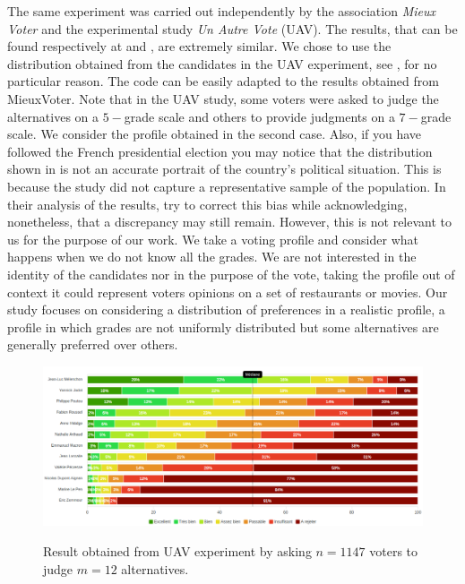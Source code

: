 	The same experiment was carried out independently by the association \textit{Mieux Voter} and the experimental study \textit{Un Autre Vote} (UAV). The results, that can be found respectively at \citet{MieuxVoterElection2022} and \citet{UAVElection2022}, are extremely similar.  We chose to use the distribution obtained from the candidates in the UAV experiment, see , for no particular reason. The code can be easily adapted to the results obtained from MieuxVoter.
	Note that in the UAV study, some voters were asked to judge the alternatives on a $5-$grade scale and others to provide judgments on a $7-$grade scale. We consider the profile obtained in the second case.
	Also, if you have followed the French presidential election you may notice that the distribution shown in  is not an accurate portrait of the country's political situation. This is because the study did not capture a representative sample of the population. In their analysis of the results, \citet{UAVElection2022} try to correct this bias while acknowledging, nonetheless, that a discrepancy may still remain.
	However, this is not relevant to us for the purpose of our work. We take a voting profile and consider what happens when we do not know all the grades. We are not interested in the identity of the candidates nor in the purpose of the vote, taking the profile out of context it could represent voters opinions on a set of restaurants or movies. Our study focuses on considering a distribution of preferences in a realistic profile, a profile in which grades are not uniformly distributed but some alternatives are generally preferred over others.
	
	
	\begin{figure}
		\caption{Result obtained from UAV experiment by asking $n=1147$ voters to judge $m=12$ alternatives.}
		\includegraphics[scale=0.35]{data/profileUAV}
		\label{fig:distributionUAV}
	\end{figure}
	
